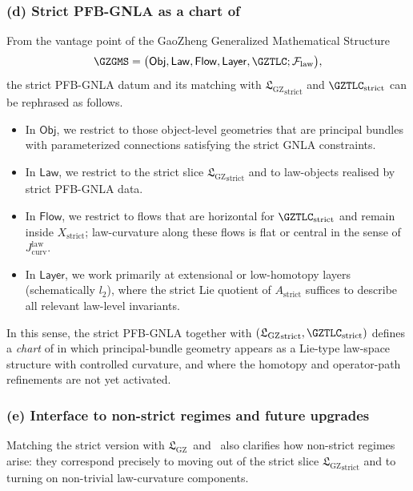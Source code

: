 \documentclass[11pt]{book}
\theoremstyle{plain}
\theoremstyle{definition}
\newcommand{\GZLS}{\ensuremath{\mathfrak{L}_{\mathrm{GZ}}}}       \newcommand{\GZLT}{\ensuremath{M_{!w}}}                           \newcommand{\GZLOC}{\ensuremath{A_M}}                             \newcommand{\GZLCurv}{\ensuremath{\mathcal{F}_{\mathrm{law}}}}
\begin{document}
\subsubsection*{(d) Strict PFB-GNLA as a chart of \GZGMS}

From the vantage point of the GaoZheng Generalized Mathematical
Structure
\[
   \GZGMS =
   \bigl(
     \mathsf{Obj},\mathsf{Law},\mathsf{Flow},\mathsf{Layer},
     \GZTLC;\GZLCurv
   \bigr),
\]
the strict PFB-GNLA datum and its matching with
${\GZLS}_{\mathrm{strict}}$ and $\GZTLC_{\mathrm{strict}}$ can be
rephrased as follows.

\begin{itemize}
  \item In $\mathsf{Obj}$, we restrict to those object-level geometries
        that are principal bundles with parameterized connections
        satisfying the strict GNLA constraints.
  \item In $\mathsf{Law}$, we restrict to the strict slice
        ${\GZLS}_{\mathrm{strict}}$ and to law-objects realised by strict
        PFB-GNLA data.
  \item In $\mathsf{Flow}$, we restrict to flows that are horizontal
        for $\GZTLC_{\mathrm{strict}}$ and remain inside
        $X_{\mathrm{strict}}$; law-curvature along these flows is flat
        or central in the sense of $J_{\mathrm{curv}}^{\mathrm{law}}$.
  \item In $\mathsf{Layer}$, we work primarily at extensional or
        low-homotopy layers (schematically $l_2$), where the strict Lie
        quotient of $A_{\mathrm{strict}}$ suffices to describe all
        relevant law-level invariants.
\end{itemize}

In this sense, the strict PFB-GNLA together with
$({\GZLS}_{\mathrm{strict}},\GZTLC_{\mathrm{strict}})$ defines a
\emph{chart} of \GZGMS in which principal-bundle geometry appears as a
Lie-type law-space structure with controlled curvature, and where the
homotopy and operator-path refinements are not yet activated.



\subsubsection*{(e) Interface to non-strict regimes and future upgrades}

Matching the strict version with \GZLS\ and \GZTLC\ also clarifies how
non-strict regimes arise: they correspond precisely to moving out of
the strict slice ${\GZLS}_{\mathrm{strict}}$ and to turning on
non-trivial law-curvature components.
\end{document}
